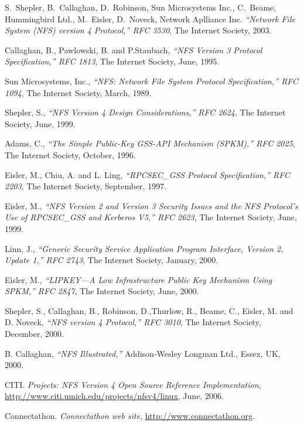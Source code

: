 \documentclass[final]{ols}
\begin{document}
\begin{thebibliography}{99}
\raggedright
{} S.\ Shepler, B.\ Callaghan, D.\ Robinson, Sun
  Microsystems Inc., C.\ Beame, Hummingbird Ltd., M.\ Eisler, D.\ Noveck,
  Network Aplliance Inc. \textit{``Network File System (NFS) version 4
    Protocol,'' RFC 3530}, The Internet Society, 2003.

 Callaghan, B., Pawlowski, B. and P.Staubach,
  \textit{``NFS Version 3 Protocol Specification,'' RFC 1813}, The
  Internet Society, June, 1995.

 Sun Microsystems, Inc., \textit{``NFS: Network File
    System Protocol Specification,'' RFC 1094}, The Internet
  Society, March, 1989.

 Shepler, S., \textit{``NFS Version 4 Design
    Considerations,'' RFC 2624}, The Internet Society, June, 1999.

 Adams, C., \textit{``The Simple Public-Key GSS-API
    Mechanism (SPKM),'' RFC 2025}, The Internet Society, October, 1996.

 Eisler, M., Chiu, A. and L. Ling,
  \textit{``RPCSEC\_GSS Protocol Specification,'' RFC 2203}, The
  Internet Society, September, 1997.

 Eisler, M., \textit{``NFS Version 2 and Version 3
    Security Issues and the NFS Protocol's Use of RPCSEC\_GSS and
    Kerberos V5,'' RFC 2623}, The Internet Society, June, 1999.

 Linn, J., \textit{``Generic Security Service
    Application Program Interface, Version 2, Update 1,'' RFC 2743},
  The Internet Society, January, 2000.

 Eisler, M., \textit{``LIPKEY---A Low Infrastructure
    Public Key Mechanism Using SPKM,'' RFC 2847}, The Internet Society,
  June, 2000.

 Shepler, S., Callaghan, B., Robinson, D.,Thurlow,
  R., Beame, C., Eisler, M. and D. Noveck, \textit{``NFS version 4
    Protocol,'' RFC 3010}, The Internet Society, December, 2000.

 B. Callaghan, \textit{``NFS Illustrated,''}
  Addison-Wesley Longman Ltd., Essex, UK, 2000.

 CITI. \textit{ Projects: NFS Version 4 Open Source
    Reference Implementation},
  \url{http://www.citi.umich.edu/projects/nfsv4/linux}, June, 2006.

 Connectathon. \textit{Connectathon web site},
  \url{http://www.connectathon.org}.


\end{thebibliography}
\end{document}

